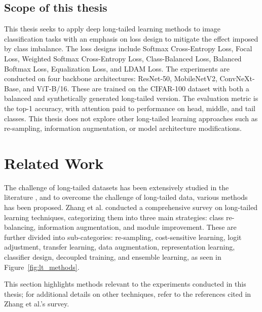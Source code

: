 \subsection{Scope of this thesis}
This thesis seeks to apply deep long-tailed learning methods to image classification tasks with an emphasis on loss design to mitigate the effect imposed by class imbalance. The loss designs include Softmax Cross-Entropy Loss, Focal Loss, Weighted Softmax Cross-Entropy Loss, Class-Balanced Loss, Balanced Boftmax Loss, Equalization Loss, and LDAM Loss. The experiments are conducted on four backbone architectures: ResNet-50, MobileNetV2, ConvNeXt-Base, and ViT-B/16. These are trained on the CIFAR-100 dataset with both a balanced and synthetically generated long-tailed version. The evaluation metric is the top-1 accuracy, with attention paid to performance on head, middle, and tail classes. This thesis does not explore other long-tailed learning approaches such as re-sampling, information augmentation, or model architecture modifications.




\section{Related Work}
The challenge of long-tailed datasets has been extensively studied in the literature \cite{zhang2023deep,zhang2024systematicreviewlongtailedlearning}, and to overcome the challenge of long-tailed data, various methods has been proposed. Zhang et al. \cite{zhang2023deep} conducted a comprehensive survey on long-tailed learning techniques, categorizing them into three main strategies: class re-balancing, information augmentation, and module improvement. These are further divided into sub-categories: re-sampling, cost-sensitive learning, logit adjustment, transfer learning, data augmentation, representation learning, classifier design, decoupled training, and ensemble learning, as seen in Figure~\ref{fig:lt_methods}. 

This section highlights methods relevant to the experiments conducted in this thesis; for additional details on other techniques, refer to the references cited in Zhang et al.'s survey.

